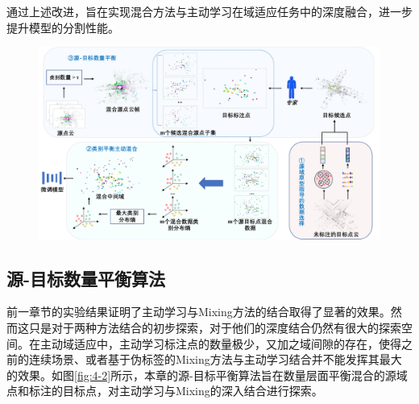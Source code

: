     通过上述改进，旨在实现混合方法与主动学习在域适应任务中的深度融合，进一步提升模型的分割性能。 
    \vspace{-0.1cm}
    \begin{figure}[h]
        \centering
        \includegraphics[width = \textwidth, scale=0.5]{ljx/figure/4-1framwork.pdf}
        \label{fig:4-1}
    \end{figure}
    \vspace{-0.35cm}
    

    \subsection{源-目标数量平衡算法}
    前一章节的实验结果证明了主动学习与Mixing方法的结合取得了显著的效果。然而这只是对于两种方法结合的初步探索，对于他们的深度结合仍然有很大的探索空间。在主动域适应中，主动学习标注点的数量极少，又加之域间隙的存在，使得之前的连续场景、或者基于伪标签的Mixing方法与主动学习结合并不能发挥其最大的效果。如图\ref{fig:4-2}所示，本章的源-目标平衡算法旨在数量层面平衡混合的源域点和标注的目标点，对主动学习与Mixing的深入结合进行探索。
    
